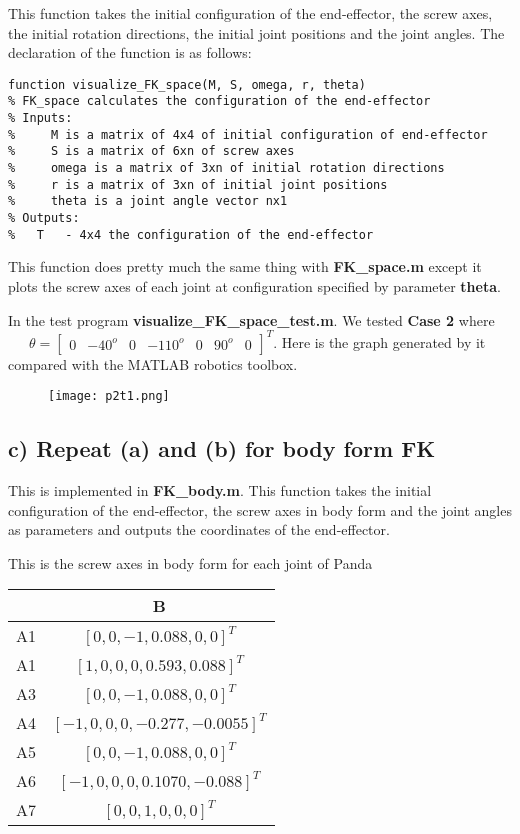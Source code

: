 \documentclass[english,10pt,a4paper]{article}
\begin{document}
    This function takes the initial configuration of the end-effector, the screw axes, the initial rotation directions, the initial joint positions and the joint angles. The declaration of the function is as follows:
    \begin{lstlisting}[style=matlab]
function visualize_FK_space(M, S, omega, r, theta)
% FK_space calculates the configuration of the end-effector
% Inputs:
%     M is a matrix of 4x4 of initial configuration of end-effector
%     S is a matrix of 6xn of screw axes
%     omega is a matrix of 3xn of initial rotation directions
%     r is a matrix of 3xn of initial joint positions
%     theta is a joint angle vector nx1
% Outputs:
%   T   - 4x4 the configuration of the end-effector
    \end{lstlisting}
    This function does pretty much the same thing with \textbf{FK\_space.m} except it plots the screw axes of each joint at configuration specified by parameter \textbf{theta}.
	
    In the test program \textbf{visualize\_FK\_space\_test.m}. We tested \textbf{Case 2} where \ \ \ $\theta = \begin{bmatrix}
        0 & -40^o & 0 & -110^o & 0 & 90^o & 0
    \end{bmatrix}^T$. Here is the graph generated by it compared with the MATLAB robotics toolbox.
    \begin{figure}[H]
        \texttt{[image: p2t1.png]}
    \end{figure}
    \subsection*{c) Repeat (a) and (b) for body form FK}
    This is implemented in \textbf{FK\_body.m}. This function takes the initial configuration of the end-effector, the screw axes in body form and the joint angles as parameters and outputs the coordinates of the end-effector.
    
    This is the screw axes in body form for each joint of Panda
    \begin{center}
        \begin{tabular}{|c|c|}
            \hline
            &  B \\
            \hline
            A1 & $[0, 0, -1, 0.088, 0, 0]^{T}$ \\
            \hline
            A1 & $[1, 0, 0, 0, 0.593, 0.088]^{T}$ \\
            \hline
            A3 & $[0, 0, -1, 0.088, 0, 0]^{T}$ \\
            \hline
            A4 & $[-1, 0, 0, 0, -0.277, -0.0055]^{T}$ \\
            \hline
            A5 & $[0, 0, -1, 0.088, 0, 0]^{T}$  \\
            \hline
            A6 & $[-1, 0, 0, 0, 0.1070, -0.088]^{T}$  \\
            \hline
            A7 & $[0, 0, 1, 0, 0, 0]^{T}$ \\
            \hline
        \end{tabular}
    \end{center}
	
\end{document}
